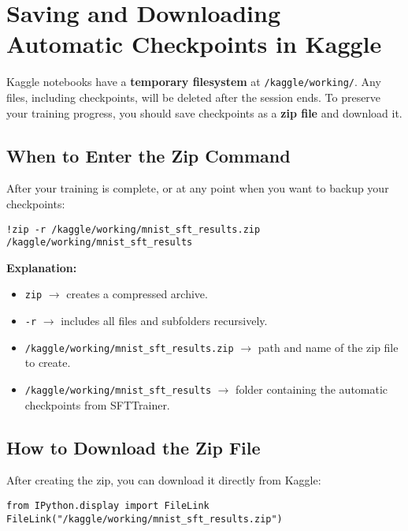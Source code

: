 \section{Saving and Downloading Automatic Checkpoints in Kaggle}

Kaggle notebooks have a \textbf{temporary filesystem} at \texttt{/kaggle/working/}. 
Any files, including checkpoints, will be deleted after the session ends. 
To preserve your training progress, you should save checkpoints as a \textbf{zip file} and download it.

\subsection{When to Enter the Zip Command}

After your training is complete, or at any point when you want to backup your checkpoints:

\begin{tcolorbox}[colback=yellow!5!white, colframe=yellow!75!black, title=Zip Checkpoints Command]
\begin{verbatim}
!zip -r /kaggle/working/mnist_sft_results.zip /kaggle/working/mnist_sft_results
\end{verbatim}
\end{tcolorbox}

\textbf{Explanation:}
\begin{itemize}
    \item \texttt{zip} $\rightarrow$ creates a compressed archive.
    \item \texttt{-r} $\rightarrow$ includes all files and subfolders recursively.
    \item \texttt{/kaggle/working/mnist\_sft\_results.zip} $\rightarrow$ path and name of the zip file to create.
    \item \texttt{/kaggle/working/mnist\_sft\_results} $\rightarrow$ folder containing the automatic checkpoints from SFTTrainer.
\end{itemize}

\subsection{How to Download the Zip File}

After creating the zip, you can download it directly from Kaggle:

\begin{tcolorbox}[colback=green!5!white, colframe=green!75!black, title=Download Example]
\begin{verbatim}
from IPython.display import FileLink
FileLink("/kaggle/working/mnist_sft_results.zip")
\end{verbatim}
\end{tcolorbox}

